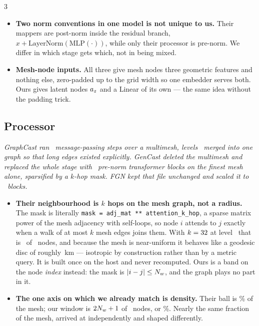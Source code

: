 \documentclass[11pt,landscape]{article}
\begin{document}
\begin{multicols}{3}
\begin{itemize}[leftmargin=1.1em]
  \item \textbf{Two norm conventions in one model is not unique to us.}  Their
    mappers are post-norm inside the residual branch,
    $x + \mathrm{LayerNorm}(\mathrm{MLP}(\cdot))$, while only their processor is
    pre-norm.  We differ in which stage gets which, not in being mixed.

  \item \textbf{Mesh-node inputs.}  All three give mesh nodes three geometric
    features and nothing else, zero-padded up to the grid width so one embedder
    serves both.  Ours gives latent nodes $a_{z}$ and a Linear of its own ---
    the same idea without the padding trick.

\end{itemize}

\subsection*{Processor}

\textit{GraphCast ran \gcsteps\ message-passing steps over a multimesh, levels
\gcmeshlevels\ merged into one graph so that long edges existed explicitly.
GenCast deleted the multimesh and replaced the whole stage with \genlayers\
pre-norm transformer blocks on the finest mesh alone, sparsified by a $k$-hop
mask.  FGN kept that file unchanged and scaled it to \fgnlayers\ blocks.}

\begin{itemize}[leftmargin=1.1em]\setlength{\itemsep}{0.45em}

  \item \textbf{Their neighbourhood is $k$ hops on the mesh graph, not a radius.}
    The mask is literally {\tt mask = adj\_mat ** attention\_k\_hop}, a sparse
    matrix power of the mesh adjacency with self-loops, so node $i$ attends to
    $j$ exactly when a walk of at most $k$ mesh edges joins them.  With
    $k = 32$ at level \dmmeshlevel\ that is \genballnodes\ of
    \dmmeshnodes\ nodes, and because the mesh is near-uniform it behaves like a
    geodesic disc of roughly \genballkm\,km --- isotropic by construction rather
    than by a metric query.  It is built once on the host and never
    recomputed.  Ours is a band on the node \emph{index} instead: the mask is
    $|i-j|\le N_{w}$, and the graph plays no part in it.

  \item \textbf{The one axis on which we already match is density.}  Their ball
    is \gendensity\% of the mesh; our window is $2N_{w}+1$ of \valNz\ nodes, or
    \valwindowfrac\%.  Nearly the same fraction of the mesh, arrived at
    independently and shaped differently.


\end{itemize}
\end{multicols}
\end{document}
